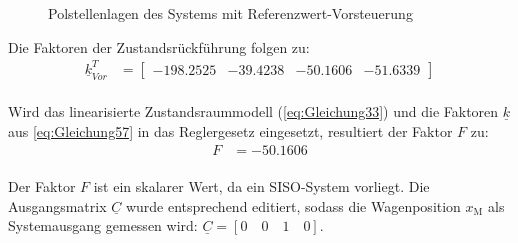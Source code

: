 \documentclass[
	pagesize,
	fontsize=12pt,
	paper=a4,
	oneside,
   reqno
]{scrartcl}
\begin{document}
\begin{figure}[H]
    \centering
    \caption[Polstellenlage Vorsteuerung]{Polstellenlagen des Systems mit Referenzwert-Vorsteuerung}
    \label{fig:Bild10}
\end{figure}
 Die Faktoren der Zustandsrückführung folgen zu:
 \begin{align} \label{eq:Gleichung57}
     \underline{k}^T_{Vor} &= 
     \begin{bmatrix}
        -198.2525 & -39.4238 & -50.1606 & -51.6339
     \end{bmatrix}
 \end{align}\\
Wird das linearisierte Zustandsraummodell (\autoref{eq:Gleichung33}) und die Faktoren $\underline{k}$ aus \autoref{eq:Gleichung57} in das Reglergesetz eingesetzt, resultiert der Faktor $F$ zu:\\
\begin{align}\label{eq:Gleichung58}
    F &= -50.1606
\end{align}\\
Der Faktor $F$ ist ein skalarer Wert, da ein SISO-System vorliegt. Die Ausgangsmatrix $\underline{C}$ wurde entsprechend editiert, sodass die Wagenposition $x_{\mathrm{M}}$ als Systemausgang gemessen wird: $\underline{C} = [0\quad0\quad1\quad0]$.
\end{document}
